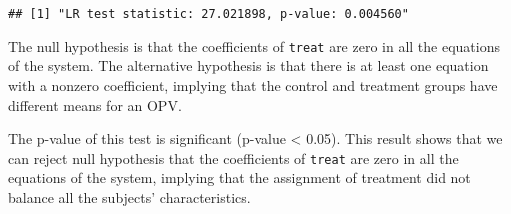 \documentclass[
]{article}
\newenvironment{Shaded}{\begin{snugshade}}{\end{snugshade}}
\newcommand{\AttributeTok}[1]{\textcolor[rgb]{0.77,0.63,0.00}{#1}}
\newcommand{\CommentTok}[1]{\textcolor[rgb]{0.56,0.35,0.01}{\textit{#1}}}
\newcommand{\ConstantTok}[1]{\textcolor[rgb]{0.00,0.00,0.00}{#1}}
\newcommand{\ControlFlowTok}[1]{\textcolor[rgb]{0.13,0.29,0.53}{\textbf{#1}}}
\newcommand{\DecValTok}[1]{\textcolor[rgb]{0.00,0.00,0.81}{#1}}
\newcommand{\FunctionTok}[1]{\textcolor[rgb]{0.00,0.00,0.00}{#1}}
\newcommand{\NormalTok}[1]{#1}
\newcommand{\OtherTok}[1]{\textcolor[rgb]{0.56,0.35,0.01}{#1}}
\newcommand{\SpecialCharTok}[1]{\textcolor[rgb]{0.00,0.00,0.00}{#1}}
\newcommand{\StringTok}[1]{\textcolor[rgb]{0.31,0.60,0.02}{#1}}
\begin{document}
\begin{Shaded}
\end{Shaded}

\begin{verbatim}
## [1] "LR test statistic: 27.021898, p-value: 0.004560"
\end{verbatim}

The null hypothesis is that the coefficients of \texttt{treat} are zero
in all the equations of the system. The alternative hypothesis is that
there is at least one equation with a nonzero coefficient, implying that
the control and treatment groups have different means for an OPV.

The p-value of this test is significant (p-value \textless{} 0.05). This
result shows that we can reject null hypothesis that the coefficients of
\texttt{treat} are zero in all the equations of the system, implying
that the assignment of treatment did not balance all the subjects'
characteristics.
\end{document}
